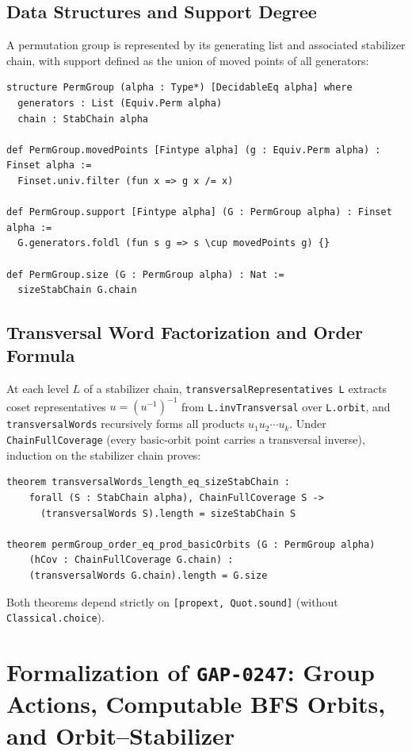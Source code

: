 \documentclass[11pt,a4paper]{article}
\begin{document}
\subsection{Data Structures and Support Degree}
A permutation group is represented by its generating list and associated stabilizer chain, with support defined as the union of moved points of all generators:

\begin{lstlisting}[language=Lean4]
structure PermGroup (alpha : Type*) [DecidableEq alpha] where
  generators : List (Equiv.Perm alpha)
  chain : StabChain alpha

def PermGroup.movedPoints [Fintype alpha] (g : Equiv.Perm alpha) : Finset alpha :=
  Finset.univ.filter (fun x => g x /= x)

def PermGroup.support [Fintype alpha] (G : PermGroup alpha) : Finset alpha :=
  G.generators.foldl (fun s g => s \cup movedPoints g) {}

def PermGroup.size (G : PermGroup alpha) : Nat :=
  sizeStabChain G.chain
\end{lstlisting}

\subsection{Transversal Word Factorization and Order Formula}
At each level $L$ of a stabilizer chain, \texttt{transversalRepresentatives L} extracts coset representatives $u = (u^{-1})^{-1}$ from \texttt{L.invTransversal} over \texttt{L.orbit}, and \texttt{transversalWords} recursively forms all products $u_1 u_2 \cdots u_k$. Under \texttt{ChainFullCoverage} (every basic-orbit point carries a transversal inverse), induction on the stabilizer chain proves:

\begin{lstlisting}[language=Lean4]
theorem transversalWords_length_eq_sizeStabChain :
    forall (S : StabChain alpha), ChainFullCoverage S ->
      (transversalWords S).length = sizeStabChain S

theorem permGroup_order_eq_prod_basicOrbits (G : PermGroup alpha)
    (hCov : ChainFullCoverage G.chain) :
    (transversalWords G.chain).length = G.size
\end{lstlisting}

Both theorems depend strictly on \texttt{[propext, Quot.sound]} (without \texttt{Classical.choice}).

\section{Formalization of \texttt{GAP-0247}: Group Actions, Computable BFS Orbits, and Orbit--Stabilizer}
\label{sec:oprtperm}
\end{document}
